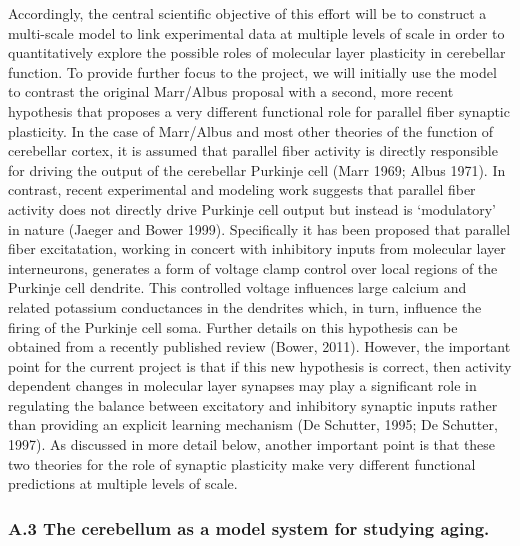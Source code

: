 \documentclass[12pt]{article}
\begin{document}
Accordingly, the central scientific objective of this effort will be to construct a multi-scale model to link experimental data at multiple levels of scale in order to quantitatively explore the possible roles of molecular layer plasticity in cerebellar function. To provide further focus to the project, we will initially use the model to contrast the original Marr/Albus proposal with a second, more recent hypothesis that proposes a very different functional role for parallel fiber synaptic plasticity. In the case of Marr/Albus and most other theories of the function of cerebellar cortex, it is assumed that parallel fiber activity is directly responsible for driving the output of the cerebellar Purkinje cell (Marr 1969; Albus 1971). In contrast, recent experimental and modeling work suggests that parallel fiber activity does not directly drive Purkinje cell output but instead is `modulatory' in nature (Jaeger and Bower 1999). Specifically it has been proposed that parallel fiber excitatation, working in concert with inhibitory inputs from molecular layer interneurons, generates a form of voltage clamp control over local regions of the Purkinje cell dendrite. This controlled voltage influences large calcium and related potassium conductances in the dendrites which, in turn, influence the firing of the Purkinje cell soma. Further details on this hypothesis can be obtained from a recently published review (Bower, 2011). However, the important point for the current project is that if this new hypothesis is correct, then activity dependent changes in molecular layer synapses may play a significant role in regulating the balance between excitatory and inhibitory synaptic inputs rather than providing an explicit learning mechanism (De Schutter, 1995; De Schutter, 1997). As discussed in more detail below, another important point is that these two theories for the role of synaptic plasticity make very different functional predictions at multiple levels of scale.\\

\subsubsection*{A.3 The cerebellum as a model system for studying aging.}
\end{document}
